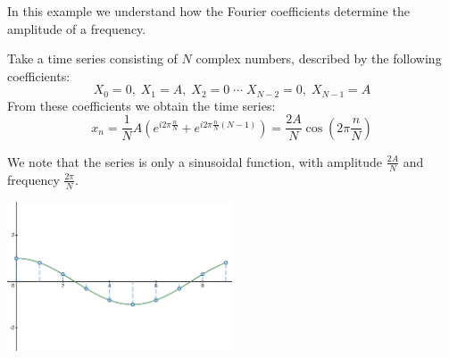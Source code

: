 \begin{exempli_gratia}[Amplitude]
	\begin{toReview}
		In this example we understand how the Fourier coefficients determine the amplitude of a frequency.
	\end{toReview}

	\noindent Take a time series consisting of $N$ complex numbers, described by the following coefficients:
	\[
		X_0=0,\;X_1=A,\;X_2=0\;\cdots\;X_{N-2}=0,\;X_{N-1}=A
	\]
	From these coefficients we obtain the time series:
	\[
		x_n = \frac{1}{N}A\left(e^{i2\pi \frac{n}{N}} + e^{i2\pi \frac{n}{N}(N-1)}\right) = \frac{2A}{N}\cos\left(2\pi\frac{n}{N}\right)
	\]
	\begin{modified}
	We note that the series is only a sinusoidal function, with amplitude $\frac{2A}{N}$ and frequency $\frac{2\pi}{N}$.
	\begin{center}
		\centering
		\includegraphics[width=0.5\textwidth]{Figures/fftexample1.png}
	\end{center}
	\end{modified}
\end{exempli_gratia}

